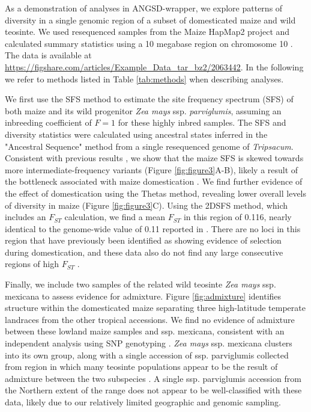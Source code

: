 \documentclass[10pt,a4paper]{article}
\newcommand{\fst}{${F_{ST}}$ }
\begin{document}
As a demonstration of analyses in ANGSD-wrapper, we explore patterns of diversity in a single genomic region of a subset of domesticated maize and wild teosinte. We used resequenced samples from the Maize HapMap2 project and calculated summary statistics using a 10 megabase region on chromosome 10 \citep{chia2012maize}. The data is available at \url{https://figshare.com/articles/Example_Data_tar_bz2/2063442}. In the following we refer to methods listed in Table \ref{tab:methods} when describing analyses.

We first use the SFS method to estimate the site frequency spectrum (SFS) of both maize and its wild progenitor \textit{Zea mays} ssp. \textit{parviglumis}, assuming an inbreeding coefficient of $F=1$ for these highly inbred samples. 
The SFS and diversity statistics were calculated using ancestral states inferred in the "Ancestral Sequence" method from a single resequenced genome of \textit{Tripsacum}.  
Consistent with previous results \citep{hufford2012comparative}, we show that the maize SFS is skewed towards more intermediate-frequency variants (Figure \ref{fig:figure3}A-B), likely a result of the bottleneck associated with maize domestication \citep{Beissinger031666}.
We find further evidence of the effect of domestication using the Thetas method, revealing lower overall levels of diversity in maize (Figure \ref{fig:figure3}C). 
Using the 2DSFS method, which includes an \fst calculation, we find a mean \fst in this region of 0.116, nearly identical to the  genome-wide value of 0.11 reported in \citet{hufford2012comparative}.   
There are no loci in this region that have previously been identified as showing evidence of selection during domestication, and these data also do not find any large consecutive regions of high \fst. 

Finally, we include two samples of the related wild teosinte \textit{Zea mays} ssp. {mexicana} to assess evidence for admixture.  
Figure \ref{fig:admixture} identifies structure within the domesticated maize separating three high-latitude temperate landraces from the other tropical accessions. 
We find no evidence of admixture between these lowland maize samples and  ssp. {mexicana}, consistent with an independent analysis using SNP genotyping \citep{hufford2013genomic}.
\textit{Zea mays} ssp. {mexicana} clusters into its own group, along with a single accession of ssp. {parviglumis} collected from region in which many teosinte populations appear to be the result of admixture between the two subspecies \citep{fang2012megabase}.  
A single  ssp. {parviglumis} accession from the Northern extent of the range does not appear to be well-classified with these data, likely due to our relatively limited geographic and genomic sampling.
\end{document}
